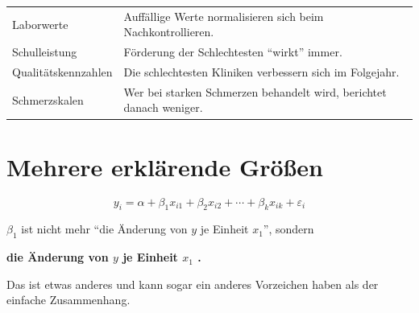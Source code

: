 \begin{warnung}
\begin{center}
\renewcommand{\arraystretch}{1.5}
\begin{tabular}{@{}P{3.2cm}P{5.4cm}@{}}
\toprule
Laborwerte & Auffällige Werte normalisieren sich beim Nachkontrollieren.\\
Schulleistung & Förderung der Schlechtesten \enquote{wirkt} immer.\\
Qualitäts\-kennzahlen & Die schlechtesten Kliniken verbessern sich im Folgejahr.\\
Schmerzskalen & Wer bei starken Schmerzen behandelt wird, berichtet danach weniger.\\
\bottomrule
\end{tabular}
\end{center}
\end{warnung}

\section{Mehrere erklärende Größen}

\begin{merksatz}
\[ y_i = \alpha + \beta_1 x_{i1} + \beta_2 x_{i2} + \cdots + \beta_k x_{ik} + \varepsilon_i \]

$\beta_1$ ist nicht mehr \enquote{die Änderung von $y$ je Einheit $x_1$}, sondern

\begin{center}
\begin{minipage}{0.9\textwidth}
\textbf{die Änderung von $y$ je Einheit $x_1$ .}
\end{minipage}
\end{center}

Das ist etwas anderes und kann sogar ein anderes Vorzeichen haben als der einfache Zusammenhang.
\end{merksatz}

